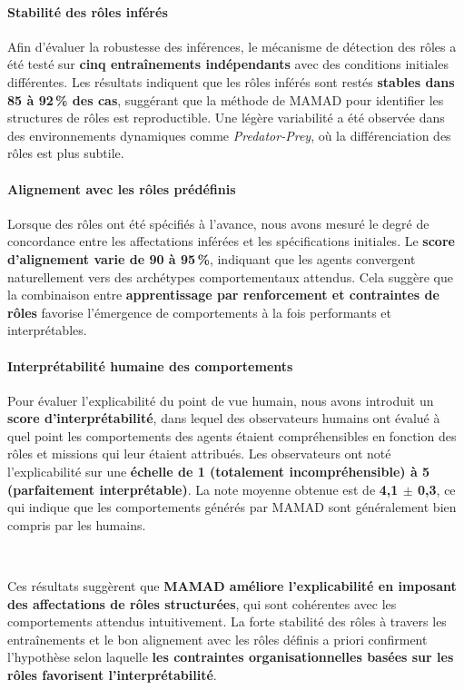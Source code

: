 \paragraph{Stabilité des rôles inférés}
Afin d'évaluer la robustesse des inférences, le mécanisme de détection des rôles a été testé sur \textbf{cinq entraînements indépendants} avec des conditions initiales différentes. Les résultats indiquent que les rôles inférés sont restés \textbf{stables dans 85 à 92\,\% des cas}, suggérant que la méthode de MAMAD pour identifier les structures de rôles est reproductible. Une légère variabilité a été observée dans des environnements dynamiques comme \textit{Predator-Prey}, où la différenciation des rôles est plus subtile.

\paragraph{Alignement avec les rôles prédéfinis}
Lorsque des rôles ont été spécifiés à l'avance, nous avons mesuré le degré de concordance entre les affectations inférées et les spécifications initiales. Le \textbf{score d'alignement varie de 90 à 95\,\%}, indiquant que les agents convergent naturellement vers des archétypes comportementaux attendus. Cela suggère que la combinaison entre \textbf{apprentissage par renforcement et contraintes de rôles} favorise l'émergence de comportements à la fois performants et interprétables.
\paragraph{Interprétabilité humaine des comportements}
Pour évaluer l'explicabilité du point de vue humain, nous avons introduit un \textbf{score d'interprétabilité}, dans lequel des observateurs humains ont évalué à quel point les comportements des agents étaient compréhensibles en fonction des rôles et missions qui leur étaient attribués. Les observateurs ont noté l'explicabilité sur une \textbf{échelle de 1 (totalement incompréhensible) à 5 (parfaitement interprétable)}. La note moyenne obtenue est de \textbf{4{,}1 $\pm$ 0{,}3}, ce qui indique que les comportements générés par MAMAD sont généralement bien compris par les humains.

\

Ces résultats suggèrent que \textbf{MAMAD améliore l'explicabilité en imposant des affectations de rôles structurées}, qui sont cohérentes avec les comportements attendus intuitivement. La forte stabilité des rôles à travers les entraînements et le bon alignement avec les rôles définis a priori confirment l'hypothèse selon laquelle \textbf{les contraintes organisationnelles basées sur les rôles favorisent l'interprétabilité}.


